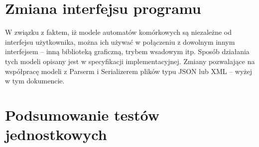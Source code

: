 \documentclass{mwart}
\begin{document}
\section{Zmiana interfejsu programu}
W związku z faktem, iż modele automatów komórkowych są niezależne od interfejsu użytkownika, można ich używać w połączeniu z dowolnym innym interfejsem -- inną biblioteką graficzną, trybem wsadowym itp. Sposób działania tych modeli opisany jest w specyfikacji implementacyjnej. Zmiany pozwalające na współpracę modeli z Parserm i Serializerem plików typu JSON lub XML -- wyżej w tym dokumencie.

\section{Podsumowanie testów jednostkowych}
\end{document}
